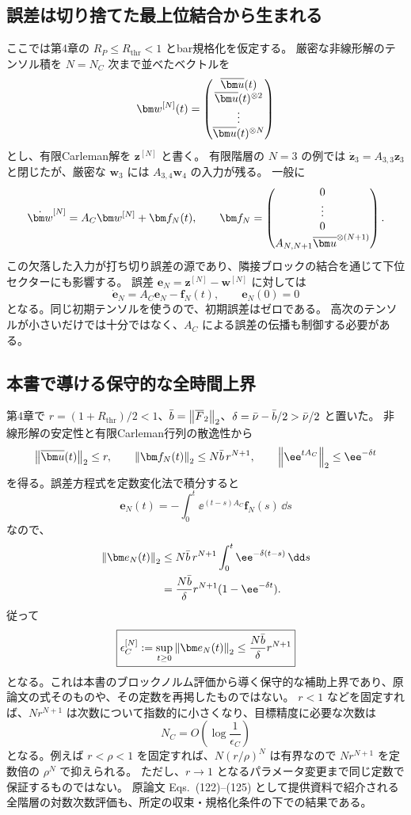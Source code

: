 \subsection{誤差は切り捨てた最上位結合から生まれる}
ここでは第4章の $R_P\leq R_{\mathrm{thr}}<1$ とbar規格化を仮定する。
厳密な非線形解のテンソル積を $N=N_C$ 次まで並べたベクトルを
\[
\bm w^{[N]}(t)=\begin{pmatrix}\bu(t)\\\bu(t)^{\otimes2}\\\vdots\\\bu(t)^{\otimes N}\end{pmatrix}
\]
とし、有限Carleman解を $\bm z^{[N]}$ と書く。
有限階層の $N=3$ の例では $\dot{\bm z}_3=A_{3,3}\bm z_3$ と閉じたが、厳密な $\bm w_3$ には $A_{3,4}\bm w_4$ の入力が残る。
一般に
\[
\dot{\bm w}^{[N]}=A_C\bm w^{[N]}+\bm f_N(t),\qquad
\bm f_N=\begin{pmatrix}0\\\vdots\\0\\A_{N,N+1}\bu^{\otimes(N+1)}\end{pmatrix}.
\]
この欠落した入力が打ち切り誤差の源であり、隣接ブロックの結合を通じて下位セクターにも影響する。
誤差 $\bm e_N=\bm z^{[N]}-\bm w^{[N]}$ に対しては
\[
\dot{\bm e}_N=A_C\bm e_N-\bm f_N(t),\qquad \bm e_N(0)=0
\]
となる。同じ初期テンソルを使うので、初期誤差はゼロである。
高次のテンソルが小さいだけでは十分ではなく、$A_C$ による誤差の伝播も制御する必要がある。

\subsection{本書で導ける保守的な全時間上界}
第4章で $r=(1+R_{\mathrm{thr}})/2<1$、$\bar b=\left\lVert \overline F_2\right\rVert_2$、$\delta=\bar\nu-\bar b/2>\bar\nu/2$ と置いた。
非線形解の安定性と有限Carleman行列の散逸性から
\[
\normtwo{\bu(t)}\leq r,\qquad
\normtwo{\bm f_N(t)}\leq N\bar b\,r^{N+1},\qquad
\normtwo{\ee^{tA_C}}\leq\ee^{-\delta t}
\]
を得る。誤差方程式を定数変化法で積分すると
\[
\bm e_N(t)=-\int_0^t\ee^{(t-s)A_C}\bm f_N(s)\,\dd s
\]
なので、
\begin{align*}
\normtwo{\bm e_N(t)}
&\leq N\bar b\,r^{N+1}\int_0^t\ee^{-\delta(t-s)}\,\dd s\\
&=\frac{N\bar b}{\delta}r^{N+1}(1-\ee^{-\delta t}).
\end{align*}
従って
\begin{equation}
\boxed{\epsilon_C^{[N]}:=\sup_{t\geq0}\normtwo{\bm e_N(t)}
\leq\frac{N\bar b}{\delta}r^{N+1}}
\label{eq:full-convergence-bound}
\end{equation}
となる。これは本書のブロックノルム評価から導く保守的な補助上界であり、原論文の式そのものや、その定数を再掲したものではない。
$r<1$ などを固定すれば、$Nr^{N+1}$ は次数について指数的に小さくなり、目標精度に必要な次数は
\[
N_C=O\!\left(\log\frac1{\epsilon_C}\right)
\]
となる。例えば $r<\rho<1$ を固定すれば、$N(r/\rho)^N$ は有界なので $Nr^{N+1}$ を定数倍の $\rho^N$ で抑えられる。
ただし、$r\to1$ となるパラメータ変更まで同じ定数で保証するものではない。
原論文 Eqs.~(122)--(125) として提供資料で紹介される全階層の対数次数評価も、所定の収束・規格化条件の下での結果である。

